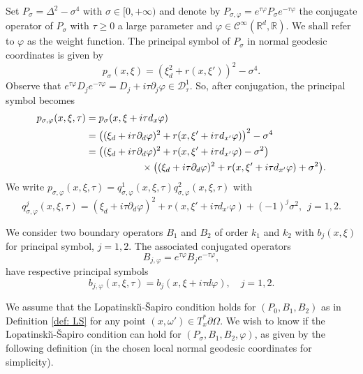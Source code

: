 \documentclass[10pt]{amsart}
\theoremstyle{plain}
\theoremstyle{definition}
\def\R{\mathbb{R}}
\newcommand{\LS}{Lopatinski\u{\i}-\v{S}apiro\xspace}
\newcommand{\Dsc}{\mathscr{D}_{\tau}}
\newcommand{\Psig}{P_{\sigma}}
\newcommand{\psig}{p_{\sigma}}
\newcommand{\Pconj}{P_{\sigma,\varphi}}
\newcommand{\pconj}{p_{\sigma,\varphi}}
\newcommand{\qconj}{q_{\sigma,\varphi}}
\newcommand{\Con}{\ensuremath{\mathscr C}}
\newcommand{\Cinf}{\ensuremath{\Con^\infty}}
\begin{document}
Set $\Psig=\Delta^2-\sigma^4$ with $\sigma\in[0,+\infty) $ and denote by $\Pconj=e^{\tau\varphi}\Psig e^{-\tau\varphi}$ the conjugate operator of $\Psig$ with $\tau\geq 0$ a large parameter and $\varphi\in\Cinf(\R^d, \R)$. We shall refer to $\varphi$ as the weight function. The principal symbol of $\Psig$ in normal geodesic coordinates is given by
\[
\psig(x,\xi)=(\xi_d^2+r(x,\xi'))^2-\sigma^4.
\]
Observe that $e^{\tau\varphi}D_je^{-\tau\varphi}=D_j+
i\tau\partial_j\varphi\in\Dsc^1$. So, after conjugation, the principal symbol becomes
\begin{align*}
\pconj(x,\xi,\tau) &= \psig(x,\xi + i \tau d_x \varphi)\\
&=\left((\xi_d+i\tau\partial_d\varphi)^2
+r(x,\xi'+i\tau d_{x'}\varphi)\right)^2
-\sigma^4\\
&= \left((\xi_d+i\tau\partial_d\varphi)^2
+r(x,\xi'+i\tau d_{x'}\varphi)-\sigma^2\right)\\
&\hspace*{2cm}\times \bigl((\xi_d+i\tau\partial_d\varphi)^2+r(x,\xi'+i\tau d_{x'}\varphi)+\sigma^2\bigr).
\end{align*}
We write
$\pconj(x,\xi,\tau)=\qconj^1(x,\xi,\tau)\qconj^2(x,\xi,\tau)$
with
\begin{equation*}
\qconj^j(x,\xi,\tau)
=(\xi_d+i\tau\partial_d\varphi)^2+r(x,\xi'+i\tau
d_{x'}\varphi)+(-1)^j\sigma^2,
\ \
j=1,2.
\end{equation*}

We consider two boundary operators
$B_1$ and $B_2$ of order $k_1$ and $k_2$ with $b_j(x,\xi)$ for
principal symbol, $j=1,2$. The associated conjugated operators
\begin{equation*}
B_{j,\varphi} = e^{\tau \varphi} B_j e^{-\tau \varphi},
\end{equation*}
have respective principal symbols
\begin{equation*}
b_{j,\varphi} (x,\xi, \tau) = b_j(x,\xi+i\tau d\varphi),\quad j=1,2.
\end{equation*}

We assume that the \LS condition holds for $(P_0, B_1, B_2)$ as in
Definition \ref{def: LS} for any point $(x,\omega')\in
T^*_x\partial\Omega$. We wish to know if the \LS condition can hold
for $(\Psig , B_1, B_2,\varphi)$, as given by the following
definition (in the chosen local normal geodesic coordinates for simplicity).
\end{document}
